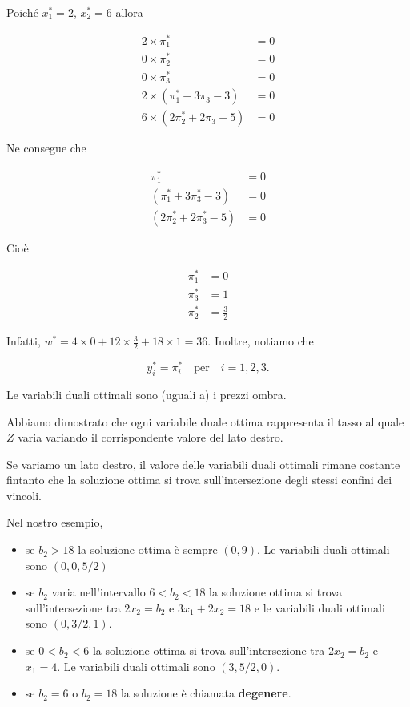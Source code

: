 \documentclass[a4paper, 11pt]{article}
\begin{document}
        Poiché $x_1^* = 2$, $x_2^* = 6$ allora

        \[
        \begin{aligned}
        2 \times \pi_1^* &= 0 \\
        0 \times \pi_2^* &= 0 \\
        0 \times \pi_3^* &= 0 \\
        2 \times (\pi_1^* + 3\pi_3 - 3) &= 0 \\
        6 \times (2\pi_2^* + 2\pi_3 - 5) &= 0
        \end{aligned}
        \]


        Ne consegue che

        \[
        \begin{aligned}
        \pi_1^* &= 0 \\
        (\pi_1^* + 3\pi_3^* - 3) &= 0 \\
        (2\pi_2^* + 2\pi_3^* - 5) &= 0
        \end{aligned}
        \]

        Cioè

        \[
        \begin{aligned}
        \pi_1^* &= 0 \\
        \pi_3^* &= 1 \\
        \pi_2^* &= \frac{3}{2}
        \end{aligned}
        \]

        Infatti, $w^* = 4 \times 0 + 12 \times \frac{3}{2} + 18 \times 1 = 36$. Inoltre, notiamo che

        \[
        y_i^* = \pi_i^* \quad \text{per} \quad i = 1, 2, 3.
        \]

        Le variabili duali ottimali sono (uguali a) i prezzi ombra.





        Abbiamo dimostrato che ogni variabile duale ottima rappresenta il tasso al quale $Z$ varia variando il corrispondente valore del lato destro.

        Se variamo un lato destro, il valore delle variabili duali ottimali rimane costante fintanto che la soluzione ottima si trova sull'intersezione degli stessi confini dei vincoli.

        Nel nostro esempio,

        \begin{itemize}
            \item se $b_2 > 18$ la soluzione ottima è sempre $(0, 9)$. Le variabili duali ottimali sono $(0, 0, 5/2)$
            \item se $b_2$ varia nell'intervallo $6 < b_2 < 18$ la soluzione ottima si trova sull'intersezione tra $2x_2 = b_2$ e $3x_1 + 2x_2 = 18$ e le variabili duali ottimali sono $(0, 3/2, 1)$.
            \item se $0 < b_2 < 6$ la soluzione ottima si trova sull'intersezione tra $2x_2 = b_2$ e $x_1 = 4$. Le variabili duali ottimali sono $(3, 5/2, 0)$.
            \item se $b_2 = 6$ o $b_2 = 18$ la soluzione è chiamata \textbf{degenere}.
        \end{itemize}
\end{document}
